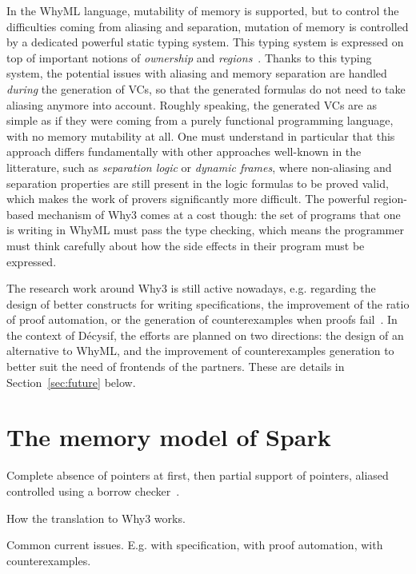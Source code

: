 \documentclass[a4paper,11pt]{article}
\begin{document}
In the WhyML language, mutability of memory is supported, but to control the
difficulties coming from aliasing and separation, mutation of memory is
controlled by a dedicated powerful static typing system. This typing system is
expressed on top of important notions of \emph{ownership} and
\emph{regions}~\cite{gondelman16reg}. Thanks to this typing system, the
potential issues with aliasing and memory separation are handled \emph{during}
the generation of VCs, so that the generated formulas do not need to take
aliasing anymore into account. Roughly speaking, the generated VCs are as simple
as if they were coming from a purely functional programming language, with no
memory mutability at all. One must understand in particular that this approach
differs fundamentally with other approaches well-known in the litterature, such
as \emph{separation logic} or \emph{dynamic frames}, where non-aliasing and
separation properties are still present in the logic formulas to be proved
valid, which makes the work of provers significantly more difficult. The
powerful region-based mechanism of Why3 comes at a cost though: the set of
programs that one is writing in WhyML must pass the type checking, which means
the programmer must think carefully about how the side effects in their program
must be expressed.

The research work around Why3 is still active nowadays, e.g. regarding
the design of better constructs for writing specifications, the
improvement of the ratio of proof automation, or the generation of
counterexamples when proofs
fail~\cite{dailler18jlamp,becker21fide}. In the context of Décysif,
the efforts are planned on two directions: the design of an
alternative to WhyML, and the improvement of counterexamples
generation to better suit the need of frontends of the partners. These
are details in Section~\ref{sec:future} below.

\section{The memory model of Spark}
\label{sec:spark}


Complete absence of pointers at first, then partial support of pointers, aliased
controlled using a borrow checker~\cite{dross20cav,jaloyan20icfem}.

How the translation to Why3 works.

Common current issues. E.g. with specification, with proof automation, with
counterexamples.
\end{document}
